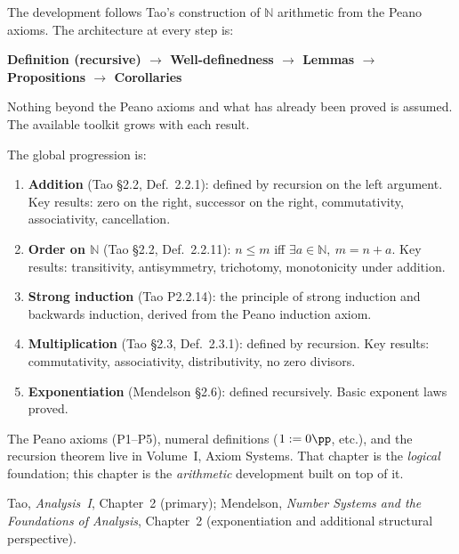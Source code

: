 The development follows Tao's construction of $\mathbb{N}$ arithmetic
from the Peano axioms. The architecture at every step is:
\begin{center}
\textbf{Definition (recursive) $\longrightarrow$ Well-definedness
$\longrightarrow$ Lemmas $\longrightarrow$ Propositions
$\longrightarrow$ Corollaries}
\end{center}

Nothing beyond the Peano axioms and what has already been proved
is assumed. The available toolkit grows with each result.

The global progression is:
\begin{enumerate}
  \item \textbf{Addition} (Tao §2.2, Def.~2.2.1):
        defined by recursion on the left argument.
        Key results: zero on the right, successor on the right,
        commutativity, associativity, cancellation.
  \item \textbf{Order on $\mathbb{N}$} (Tao §2.2, Def.~2.2.11):
        $n \leq m$ iff $\exists a \in \mathbb{N},\ m = n + a$.
        Key results: transitivity, antisymmetry, trichotomy,
        monotonicity under addition.
  \item \textbf{Strong induction} (Tao P2.2.14):
        the principle of strong induction and backwards induction,
        derived from the Peano induction axiom.
  \item \textbf{Multiplication} (Tao §2.3, Def.~2.3.1):
        defined by recursion. Key results: commutativity,
        associativity, distributivity, no zero divisors.
  \item \textbf{Exponentiation} (Mendelson §2.6):
        defined recursively. Basic exponent laws proved.
\end{enumerate}

\vspace{1em}

\begin{remark}
The Peano axioms (P1--P5), numeral definitions ($1 := 0\pp$, etc.),
and the recursion theorem live in Volume~I, Axiom Systems.
That chapter is the \emph{logical} foundation; this chapter is the
\emph{arithmetic} development built on top of it.
\end{remark}

\begin{remark}
Tao, \textit{Analysis~I}, Chapter~2 (primary);
Mendelson, \textit{Number Systems and the Foundations of Analysis},
Chapter~2 (exponentiation and additional structural perspective).
\end{remark}


